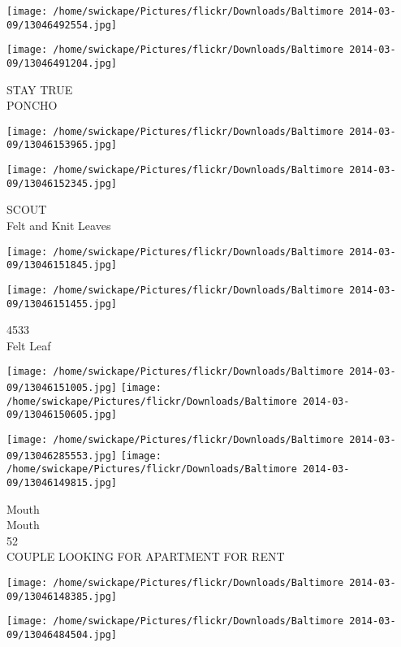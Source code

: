 \documentclass[10pt,letterpaper]{article}
\begin{document}
\texttt{[image: /home/swickape/Pictures/flickr/Downloads/Baltimore 2014-03-09/13046492554.jpg]}

\vspace{0.25in}
\texttt{[image: /home/swickape/Pictures/flickr/Downloads/Baltimore 2014-03-09/13046491204.jpg]}

STAY TRUE\\
PONCHO\\
\pagebreak

\texttt{[image: /home/swickape/Pictures/flickr/Downloads/Baltimore 2014-03-09/13046153965.jpg]}

\vspace{0.25in}
\texttt{[image: /home/swickape/Pictures/flickr/Downloads/Baltimore 2014-03-09/13046152345.jpg]}

SCOUT\\
Felt and Knit Leaves\\
\pagebreak

\texttt{[image: /home/swickape/Pictures/flickr/Downloads/Baltimore 2014-03-09/13046151845.jpg]}

\vspace{0.25in}
\texttt{[image: /home/swickape/Pictures/flickr/Downloads/Baltimore 2014-03-09/13046151455.jpg]}

4533\\
Felt Leaf\\
\pagebreak

\texttt{[image: /home/swickape/Pictures/flickr/Downloads/Baltimore 2014-03-09/13046151005.jpg]}
\texttt{[image: /home/swickape/Pictures/flickr/Downloads/Baltimore 2014-03-09/13046150605.jpg]}

\texttt{[image: /home/swickape/Pictures/flickr/Downloads/Baltimore 2014-03-09/13046285553.jpg]}
\texttt{[image: /home/swickape/Pictures/flickr/Downloads/Baltimore 2014-03-09/13046149815.jpg]}

Mouth\\
Mouth\\
52\\
COUPLE LOOKING FOR APARTMENT FOR RENT\\
\pagebreak

\texttt{[image: /home/swickape/Pictures/flickr/Downloads/Baltimore 2014-03-09/13046148385.jpg]}

\vspace{0.25in}
\texttt{[image: /home/swickape/Pictures/flickr/Downloads/Baltimore 2014-03-09/13046484504.jpg]}
\end{document}
